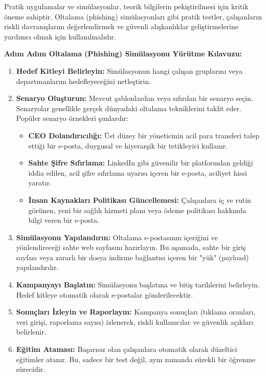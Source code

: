 Pratik uygulamalar ve simülasyonlar, teorik bilgilerin pekiştirilmesi için kritik öneme sahiptir. Oltalama (phishing) simülasyonları gibi pratik testler, çalışanların riskli davranışlarını değerlendirmek ve güvenli alışkanlıklar geliştirmelerine yardımcı olmak için kullanılmalıdır.

\textbf{Adım Adım Oltalama (Phishing) Simülasyonu Yürütme Kılavuzu:}
\begin{enumerate}
    \item \textbf{Hedef Kitleyi Belirleyin:} Simülasyonun hangi çalışan gruplarını veya departmanlarını hedefleyeceğini netleştirin.
    \item \textbf{Senaryo Oluşturun:} Mevcut şablonlardan veya sıfırdan bir senaryo seçin. Senaryolar genellikle gerçek dünyadaki oltalama tekniklerini taklit eder. Popüler senaryo örnekleri şunlardır:
    \begin{itemize}
        \item \textbf{CEO Dolandırıcılığı:} Üst düzey bir yöneticinin acil para transferi talep ettiği bir e-posta, duygusal ve hiyerarşik bir tetikleyici kullanır.
        \item \textbf{Sahte Şifre Sıfırlama:} LinkedIn gibi güvenilir bir platformdan geldiği iddia edilen, acil şifre sıfırlama uyarısı içeren bir e-posta, aciliyet hissi yaratır.
        \item \textbf{İnsan Kaynakları Politikası Güncellemesi:} Çalışanlara iç ve rutin görünen, yeni bir sağlık hizmeti planı veya ödeme politikası hakkında bilgi veren bir e-posta.
    \end{itemize}
    \item \textbf{Simülasyonu Yapılandırın:} Oltalama e-postasının içeriğini ve yönlendireceği sahte web sayfasını hazırlayın. Bu aşamada, sahte bir giriş sayfası veya zararlı bir dosya indirme bağlantısı içeren bir "yük" (payload) yapılandırılır.
    \item \textbf{Kampanyayı Başlatın:} Simülasyonu başlatma ve bitiş tarihlerini belirleyin. Hedef kitleye otomatik olarak e-postalar gönderilecektir.
    \item \textbf{Sonuçları İzleyin ve Raporlayın:} Kampanya sonuçları (tıklama oranları, veri girişi, raporlama sayısı) izlenerek, riskli kullanıcılar ve güvenlik açıkları belirlenir.
    \item \textbf{Eğitim Ataması:} Başarısız olan çalışanlara otomatik olarak düzeltici eğitimler atanır. Bu, sadece bir test değil, aynı zamanda sürekli bir öğrenme sürecidir.
\end{enumerate}

